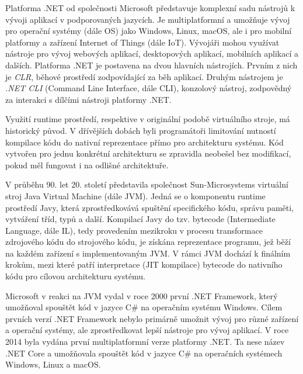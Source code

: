 

Platforma .NET od společnosti Microsoft představuje komplexní sadu nástrojů k vývoji aplikací v podporovaných jazycích. Je multiplatformní a umožňuje vývoj pro operační systémy (dále OS) jako Windows, Linux, macOS, ale i pro mobilní platformy a zařízení Internet of Things (dále IoT). Vývojáři mohou využívat nástroje pro vývoj webových aplikací, desktopových aplikací, mobilních aplikací a dalších. Platforma .NET je postavena na dvou hlavních nástrojích. Prvním z nich je \textit{CLR}, běhové prostředí zodpovídající za běh aplikací. Druhým nástrojem je \textit{.NET CLI} (Command Line Interface, dále CLI), konzolový nástroj, zodpovědný za interakci s dílčími nástroji platformy .NET.


Využití runtime prostředí, respektive v originální podobě virtuálního stroje, má historický původ. V dřívějších dobách byli programátoři limitování nutností kompilace kódu do nativní reprezentace přímo pro architekturu systému. Kód vytvořen pro jednu konkrétní architekturu se zpravidla neobešel bez modifikací, pokud měl fungovat i na odlišné architektuře.

V průběhu 90. let 20. století představila společnost Sun-Microsystems virtuální stroj Java Virtual Machine (dále JVM). Jedná se o komponentu runtime prostředí Javy, která zprostředkovává spuštění specifického kódu, správu paměti, vytváření tříd, typů a další. Kompilací Javy do tzv. bytecode (Intermediate Language, dále IL), tedy provedením mezikroku v procesu transformace zdrojového kódu do strojového kódu, je získána reprezentace programu, jež běží na každém zařízení s implementovaným JVM. V rámci JVM dochází k finálním krokům, mezi které patří interpretace (JIT kompilace) bytecode do nativního kódu pro cílovou architekturu systému. 

Microsoft v reakci na JVM vydal v roce 2000 první .NET Framework, který umožňoval spouštět kód v jazyce C\# na operačním systému Windows. Cílem prvních verzí .NET Framework nebylo primárně umožnit vývoj pro různé zařízení a operační systémy, ale zprostředkovat lepší nástroje pro vývoj aplikací. \cite{Troelsen2003} V roce 2014 byla vydána první multiplatformní verze platformy .NET. Ta nese název .NET Core a umožňovala spouštět kód v jazyce C\# na operačních systémech Windows, Linux a macOS. 

